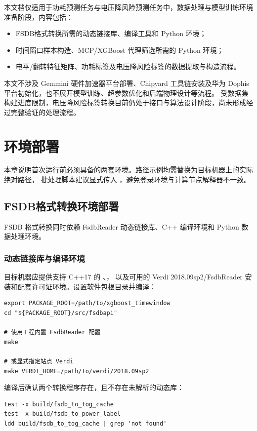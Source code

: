 \documentclass{fduthesis}
\newcommand{\code}[1]{{\ttfamily\urlstyle{tt}\path{#1}}}
\begin{document}
本文档仅适用于功耗预测任务与电压降风险预测任务中，数据处理与模型训练环境准备阶段，内容包括：
\begin{itemize}
  \item FSDB格式转换所需的动态链接库、编译工具和 Python 环境；
  \item 时间窗口样本构造、MCP/XGBoost 代理筛选所需的 Python 环境；
  \item 电平/翻转特征矩阵、功耗标签及电压降风险标签的数据提取与构造流程。
\end{itemize}
本文不涉及 Gemmini 硬件加速器平台部署、Chipyard 工具链安装及华为 Dophis 平台初始化，也不展开模型训练、超参数优化和后端物理设计等流程。
受数据集构建进度限制，电压降风险标签转换目前仍处于接口与算法设计阶段，尚未形成经过完整验证的处理流程。

\chapter{环境部署}

本章说明首次运行前必须具备的两套环境。路径示例均需替换为目标机器上的实际绝对路径，
批处理脚本建议显式传入 \code{PYTHON}，避免登录环境与计算节点解释器不一致。

\section{FSDB格式转换环境部署}

FSDB 格式转换同时依赖 FsdbReader 动态链接库、C++ 编译环境和 Python 数据处理环境。

\subsection{动态链接库与编译环境}

目标机器应提供支持 C++17 的 \code{g++}、\code{make}，
以及可用的 Verdi 2018.09sp2/FsdbReader 安装和配套许可证环境。设置软件包根目录并编译：

\begin{lstlisting}
export PACKAGE_ROOT=/path/to/xgboost_timewindow
cd "${PACKAGE_ROOT}/src/fsdbapi"

# 使用工程内置 FsdbReader 配置
make

# 或显式指定站点 Verdi
make VERDI_HOME=/path/to/verdi/2018.09sp2
\end{lstlisting}

编译后确认两个转换程序存在，且不存在未解析的动态库：

\begin{lstlisting}
test -x build/fsdb_to_tog_cache
test -x build/fsdb_to_power_label
ldd build/fsdb_to_tog_cache | grep 'not found'
\end{lstlisting}
\end{document}
